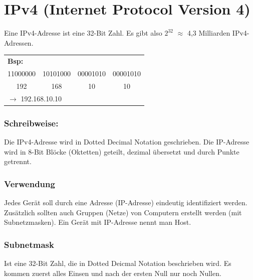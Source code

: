 \chapter{IPv4 (Internet Protocol Version 4)}
Eine IPv4-Adresse ist eine 32-Bit Zahl. Es gibt also $2^{32}$ $\approx$ 4,3 Milliarden IPv4-Adressen.

\begin{table}[H]
	\begin{tabular}{c|c|c|c}
		 \multicolumn{4}{l}{\textbf{Bsp:}} \\
		11000000 & 10101000 & 00001010 & 00001010 \\
		192 & 168 & 10 & 10 \\
		 \multicolumn{4}{l}{$\rightarrow$ 192.168.10.10} \\
	\end{tabular}
\end{table}
\subsection*{Schreibweise:}
Die IPv4-Adresse wird in Dotted Decimal Notation geschrieben. Die IP-Adresse wird in 8-Bit Blöcke (Oktetten) geteilt, dezimal übersetzt und durch Punkte getrennt.

\subsection*{Verwendung}
Jedes Gerät soll durch eine Adresse (IP-Adresse) eindeutig identifiziert werden. Zusätzlich sollten auch Gruppen (Netze) von Computern erstellt werden (mit Subnetzmasken). Ein Gerät mit IP-Adresse nennt man Host.

\subsection*{Subnetmask}
Ist eine 32-Bit Zahl, die in Dotted Deicmal Notation beschrieben wird. Es kommen zuerst alles Einsen und nach der ersten Null nur noch Nullen. 

